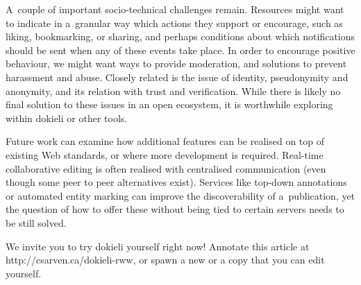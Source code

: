 \documentclass[a4paper]{llncs}
\begin{document}
                            
\par 
                                A couple of important socio-technical challenges remain.
                                Resources might want to indicate in a granular way
                                which actions they support or encourage,
                                such as liking, bookmarking, or sharing,
                                and perhaps conditions about which notifications should be sent
                                when any of these events take place.
                                In order to encourage positive behaviour,
                                we might want ways to provide moderation,
                                and solutions to prevent harassment and abuse.
                                Closely related is the issue of identity, pseudonymity and anonymity,
                                and its relation with trust and verification.
                                While there is likely no final solution to these issues in an open ecosystem,
                                it is worthwhile exploring within dokieli or other tools.
                            
                            
\par 
                                Future work can examine how
                                additional features can be realised
                                on top of existing Web standards,
                                or where more development is required.
                                Real-time collaborative editing
                                is often realised with centralised communication
                                (even though some peer to peer alternatives exist).
                                Services like top-down annotations or automated entity marking
                                can improve the discoverability of a publication,
                                yet the question of how to offer these
                                without being tied to certain servers needs to be still solved.
                            

                            
\par We invite you to try dokieli yourself right now! Annotate this article at http://csarven.ca/dokieli-rww, or spawn a new or a copy that you can edit yourself.
                        
                    
\end{document}
